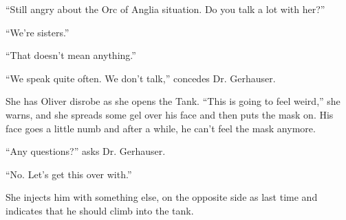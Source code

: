``Still angry about the Orc of Anglia situation.  Do you talk a lot with her?''

``We're sisters.''

``That doesn't mean anything.''

``We speak quite often.  We don't talk,'' concedes Dr. Gerhauser.



She has Oliver disrobe as she opens the Tank.  ``This is going to feel weird,'' she warns, and she spreads some gel over his face and then puts the mask on.  His face goes a little numb and after a while, he can't feel the mask anymore.

``Any questions?'' asks Dr. Gerhauser.

``No. Let's get this over with.''

She injects him with something else, on the opposite side as last time and indicates that he should climb into the tank.  



